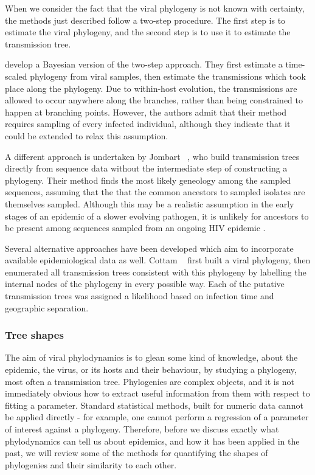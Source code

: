 When we consider the fact that the viral phylogeny is not known with certainty,
the methods just described follow a two-step procedure. The first step is to
estimate the viral phylogeny, and the second step is to use it to estimate the
transmission tree.

\autocite{didelot2014bayesian} develop a Bayesian version of the two-step
approach. They first estimate a time-scaled phylogeny from viral samples, then
estimate the transmissions which took place along the phylogeny. Due to
within-host evolution, the transmissions are allowed to occur anywhere along
the branches, rather than being constrained to happen at branching points.
However, the authors admit that their method requires sampling of every
infected individual, although they indicate that it could be extended to relax
this assumption.

A different approach is undertaken by Jombart
\etal~\autocite{jombart2011reconstructing}, who build transmission trees
directly from sequence data without the intermediate step of constructing a
phylogeny. Their method finds the most likely geneology among the sampled
sequences, assuming that the that the common ancestors to sampled isolates are
themselves sampled. Although this may be a realistic assumption in the early
stages of an epidemic of a slower evolving pathogen, it is unlikely for
ancestors to be present among sequences sampled from an ongoing HIV epidemic
.

Several alternative approaches have been developed which aim to
incorporate available epidemiological data as well. Cottam
\etal~\autocite{cottam2008integrating} first built a viral phylogeny, then
enumerated all transmission trees consistent with this phylogeny by labelling
the internal nodes of the phylogeny in every possible way. Each of the putative
transmission trees was assigned a likelihood based on infection time and
geographic separation. 


\subsubsection{Tree shapes}
\label{subsubsec:treeshape}

The aim of viral phylodynamics is to glean some kind of knowledge, about the
epidemic, the virus, or its hosts and their behaviour, by studying a phylogeny,
most often a transmission tree. Phylogenies are complex objects, and it is not
immediately obvious how to extract useful information from them with respect to
fitting a parameter. Standard statistical methods, built for numeric data
cannot be applied directly - for example, one cannot perform a regression of a
parameter of interest against a phylogeny. Therefore, before we discuss exactly
what phylodynamics can tell us about epidemics, and how it has been applied in
the past, we will review some of the methods for quantifying the shapes of
phylogenies and their similarity to each other.

